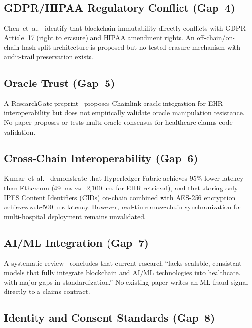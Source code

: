 \documentclass[journal]{IEEEtran}
\begin{document}
\subsection{GDPR/HIPAA Regulatory Conflict (Gap~4)}

Chen~et~al.~\cite{lit:pmc12650700} identify that blockchain immutability
directly conflicts with GDPR Article~17 (right to erasure) and HIPAA amendment
rights. An off-chain/on-chain hash-split architecture is proposed but no
tested erasure mechanism with audit-trail preservation exists.

\subsection{Oracle Trust (Gap~5)}

A ResearchGate preprint~\cite{lit:rg_oracle} proposes Chainlink oracle
integration for EHR interoperability but does not empirically validate oracle
manipulation resistance. No paper proposes or tests multi-oracle consensus
for healthcare claims code validation.

\subsection{Cross-Chain Interoperability (Gap~6)}

Kumar~et~al.~\cite{lit:springer_interop} demonstrate that Hyperledger Fabric
achieves 95\% lower latency than Ethereum (49~ms vs.\ 2,100~ms for EHR
retrieval), and that storing only IPFS Content Identifiers (CIDs) on-chain
combined with AES-256 encryption achieves sub-500~ms latency. However,
real-time cross-chain synchronization for multi-hospital deployment remains
unvalidated.

\subsection{AI/ML Integration (Gap~7)}

A systematic review~\cite{lit:pmc12650700} concludes that current research
``lacks scalable, consistent models that fully integrate blockchain and AI/ML
technologies into healthcare, with major gaps in standardization.''
No existing paper writes an ML fraud signal directly to a claims contract.

\subsection{Identity and Consent Standards (Gap~8)}
\end{document}
